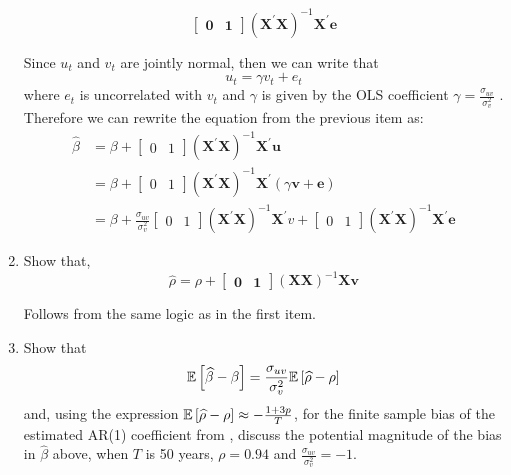 \documentclass[12pt,twoside]{article}
\begin{document}
\begin{enumerate}[label = (\alph*)]
\[\begin{bmatrix}
            \mathbf{0} & \mathbf{1}
        \end{bmatrix}\left(\mathbf{X}^\prime \mathbf{X}\right)^{-1}\mathbf{X}^\prime \mathbf{e}
    \]
    \begin{solution}
        Since \(u_t\) and \(v_t\) are jointly normal, then we can write that 
        \[
            u_t = \gamma v_t + e_t
        \]
        where \(e_t\) is uncorrelated with \(v_t\) and \(\gamma\) is given by the OLS coefficient \(\gamma = \frac{\sigma_{uv}}{\sigma_v^2}\) . Therefore we can rewrite the equation from the previous item as:
        \begin{align*}
            \widehat\beta & = \beta + \begin{bmatrix} 0 & 1 \end{bmatrix}\left(\mathbf X^\prime \mathbf X\right)^{-1}\mathbf X^\prime \mathbf u \\
            & = \beta + \begin{bmatrix} 0 & 1 \end{bmatrix}\left(\mathbf X^\prime \mathbf X\right)^{-1}\mathbf X^\prime  \left(\gamma \mathbf v + \mathbf e\right) \\
            & = \beta + \frac{\sigma_{uv}}{\sigma_v^2}\begin{bmatrix} 0 & 1 \end{bmatrix}\left(\mathbf X^\prime \mathbf X\right)^{-1} \mathbf X^\prime v + \begin{bmatrix} 0 & 1 \end{bmatrix}\left(\mathbf X^\prime \mathbf X\right)^{-1}\mathbf X^\prime \mathbf e
        \end{align*}
    \end{solution}
    \item Show that,
    \[
        \widehat \rho = \rho + \begin{bmatrix}
            \mathbf{0} & \mathbf{1}
        \end{bmatrix}\left(\mathbf{X} \mathbf{X}\right)^{-1}\mathbf{X} \mathbf{v}
    \]
    \begin{solution}
        Follows from the same logic as in the first item.
    \end{solution}
    \item Show that
    \[
        \mathbb{E}\left[\widehat\beta-\beta\right] = \frac{\sigma_{uv}}{\sigma_v^2} \mathbb{E}\left[\widehat\rho - \rho\right]
    \]
    and, using the expression \(\mathbb{E}\left[\widehat\rho-\rho\right]\approx -\frac{1+3p}{T}\), for the finite sample bias of the estimated AR(1) coefficient from \citet{kendall1954note}, discuss the potential magnitude of the bias in \(\widehat\beta\) above, when \(T\) is 50 years, \(\rho = 0.94\) and \(\frac{\sigma_{uv}}{\sigma_v^2} = -1\).

\end{enumerate}
\end{document}
